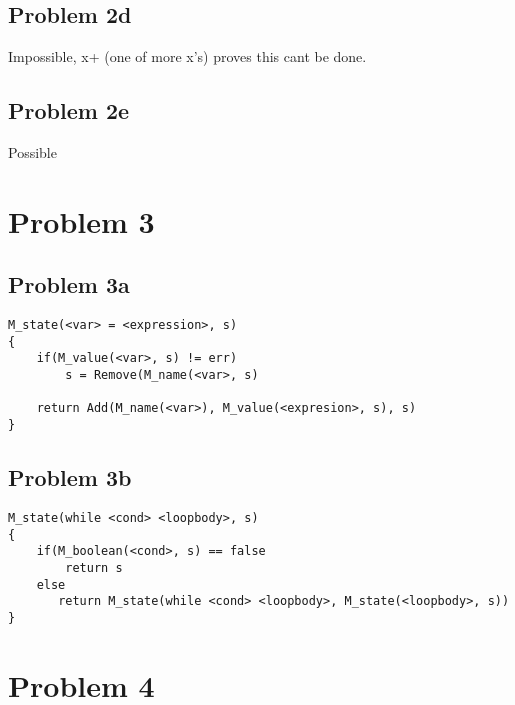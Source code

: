 \documentclass{article}
\begin{document}
\subsection*{Problem 2d}
Impossible, x+ (one of more x's) proves this cant be done. \\

\subsection*{Problem 2e}
Possible \\

\section*{Problem 3}
\subsection*{Problem 3a}
\begin{verbatim}
M_state(<var> = <expression>, s)
{
    if(M_value(<var>, s) != err)
        s = Remove(M_name(<var>, s)
    
    return Add(M_name(<var>), M_value(<expresion>, s), s)
}
\end{verbatim}

\subsection*{Problem 3b}
\begin{verbatim}
M_state(while <cond> <loopbody>, s)
{
    if(M_boolean(<cond>, s) == false
        return s
    else
       return M_state(while <cond> <loopbody>, M_state(<loopbody>, s))
}
\end{verbatim}

\section*{Problem 4}
\end{document}
